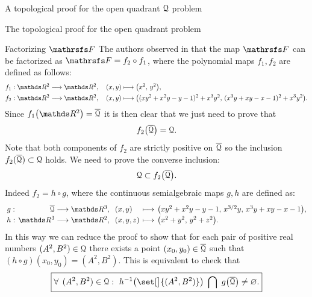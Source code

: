 \documentclass[11pt, a4paper, english, twoside, notitlepage, openright]{report}
\begin{document}
\begin{chapter}{A topological proof for the open quadrant $\mathcal{Q}$ problem}
\begin{section}{The topological proof for the open quadrant problem}

\begin{subsection}{Factorizing $\FFF$}
The authors observed in \cite[Section 3]{fgu} that the map $\FFF$ can be factorized as $\FFF=f_2\circ f_1$, where the polynomial maps $f_1, f_2$ are defined as follows:
\begin{align*}
&f_1:\R^2\longrightarrow\R^2,\quad (x,y)\longmapsto\big(x^2,\,y^2\big),\\
&f_2:\R^2\longrightarrow\R^2,\quad (x,y)\longmapsto\big((xy^2+x^2y-y-1)^2+x^3y^2,\,(x^3y+xy-x-1)^2+x^3y^2\big).
\end{align*}
Since $f_1\big(\R^2\big)=\overline{\Qu}$ it is then clear that we just need to prove that
\begin{equation}
f_2\big(\overline{\mathcal{Q}}\big)=\mathcal{Q}.
\end{equation}
Note that both components of $f_2$ are strictly positive on $\overline{\mathcal{Q}}$ so the inclusion $f_2(\overline{\mathcal{Q}})\subset\mathcal{Q}$ holds. We need to prove the converse inclusion:
\begin{equation}\label{mainTop}
\mathcal{Q}\subset f_2\big(\overline{\mathcal{Q}}\big).
\end{equation}
Indeed $f_2=h\circ g$, where the continuous semialgebraic maps $g, h$ are defined as:
$$
\arraycolsep=2pt\def\arraystretch{1.2}
\begin{array}{crlcl}
g:&\overline{\Qu}\longrightarrow\R^3,&\ (x,y)&\longmapsto&\big(xy^2+x^2y-y-1,\,x^{3/2}y,\,x^3y+xy-x-1\big),\\
h:&\R^3\longrightarrow\R^2,&\ (x,y,z)&\longmapsto&\big(x^2+y^2,\,y^2+z^2\big).\\
\end{array}
$$
In this way we can reduce the proof to show that for each pair of positive real numbers $(A^2,B^2)\in\mathcal{Q}$ there exists a point $(x_0,y_0)\in\overline{\mathcal{Q}}$ such that $(h\circ g)(x_0,y_0)=(A^2,B^2)$. This is equivalent to check that
\begin{equation*}
\boxed{
\forall\, \,  (A^2,B^2)\in\Qu:\ h^{-1}\big(\set[\big]{(A^2,B^2)}\big)\ \bigcap\ g\big(\overline{\Qu}\big)\ne\varnothing.
}
\end{equation*}


\end{subsection}
\end{section}
\end{chapter}
\end{document}
